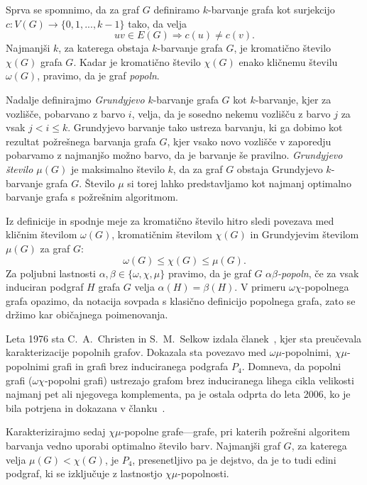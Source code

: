 \documentclass[12pt,a4paper,twoside]{article}
\theoremstyle{definition} %
\theoremstyle{plain} %
\numberwithin{equation}{section}  %
\begin{document}
\medskip
Sprva se spomnimo, da za graf $G$ definiramo $k$-barvanje grafa kot surjekcijo $c: V(G) \rightarrow \{0, 1, ..., k-1\}$ tako, da velja $$uv \in E(G) \Rightarrow c(u) \neq c(v).$$ Najmanjši $k$, za katerega obstaja $k$-barvanje grafa $G$, je kromatično število $\chi(G)$ grafa $G$. Kadar je kromatično število $\chi(G)$ enako kličnemu številu $\omega(G)$, pravimo, da je graf \emph{popoln}.  

\medskip
Nadalje definirajmo \emph{Grundyjevo} $k$-barvanje grafa $G$ kot $k$-barvanje, kjer za vozlišče, pobarvano z barvo $i$, velja, da je sosedno nekemu vozlišču z barvo $j$ za vsak $j < i \leq k$. Grundyjevo barvanje tako ustreza barvanju, ki ga dobimo kot rezultat požrešnega barvanja grafa $G$, kjer vsako novo vozlišče v zaporedju  pobarvamo z najmanjšo možno barvo, da je barvanje še pravilno. \emph{Grundyjevo število $\mu(G)$} je maksimalno število $k$, da za graf $G$ obstaja Grundyjevo $k$-barvanje grafa $G$. Število $\mu$ si torej lahko predstavljamo kot najmanj optimalno barvanje grafa s požrešnim algoritmom.

Iz definicije in spodnje meje za kromatično število hitro sledi povezava med kličnim številom $\omega(G)$, kromatičnim številom $\chi(G)$ in Grundyjevim številom $\mu(G)$ za graf $G$: $$\omega(G) \leq \chi(G) \leq \mu(G).$$ Za poljubni lastnosti $\alpha, \beta \in \{\omega, \chi, \mu\}$ pravimo, da je graf $G$ \emph{$\alpha\beta$-popoln}, če za vsak induciran podgraf $H$ grafa $G$ velja $\alpha(H) = \beta(H)$. V primeru $\omega\chi$-popolnega grafa opazimo, da notacija sovpada s klasično definicijo popolnega grafa, zato se držimo kar običajnega poimenovanja.

Leta 1976 sta C.~A.~Christen in S.~M.~Selkow izdala članek~\cite{christen1979some}, kjer sta preučevala karakterizacije popolnih grafov. Dokazala sta povezavo med $\omega\mu$-popolnimi, $\chi\mu$-popolnimi grafi in grafi brez induciranega podgrafa $P_4$. Domneva, da popolni grafi ($\omega\chi$-popolni grafi) ustrezajo grafom brez induciranega lihega cikla velikosti najmanj pet ali njegovega komplementa, pa je ostala odprta do leta 2006, ko je bila potrjena in dokazana v članku~\cite{chudnovsky2006strong}. 

Karakterizirajmo sedaj $\chi\mu$-popolne grafe---grafe, pri katerih požrešni algoritem barvanja vedno  uporabi optimalno število barv. Najmanjši graf $G$, za katerega velja $\mu(G) < \chi(G)$, je $P_4$, presenetljivo pa je dejstvo, da je to tudi edini podgraf, ki se izključuje z lastnostjo $\chi\mu$-popolnosti.
\end{document}

